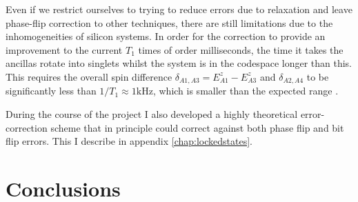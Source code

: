 \documentclass{report}
\begin{document}
Even if we restrict ourselves to trying to reduce errors due to relaxation and leave phase-flip correction to other techniques, there are still limitations due to the inhomogeneities of silicon systems. In order for the correction to provide an improvement to the current $T_1$ times of order milliseconds, the time it takes the ancillas rotate into singlets whilst the system is in the codespace longer than this. This requires the overall spin difference $\delta_{A1, A3} = E_{A1}^z - E_{A3}^z$ and $\delta_{A2, A4}$ to be significantly less than $1/T_1 \approx 1\unit{\kilo\hertz}$, which is smaller than the expected range \cite{Hwang2017}.

During the course of the project I also developed a highly theoretical error-correction scheme that in principle could correct against both phase flip and bit flip errors. This I describe in appendix \ref{chap:lockedstates}. 
\section{Conclusions}

\printbibliography %
\end{document}
